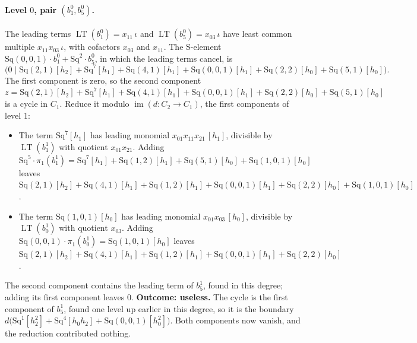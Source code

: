 \documentclass[11pt]{article}
\newcommand{\Sq}{\mathrm{Sq}}
\DeclareMathOperator{\LT}{LT}
\begin{document}
\paragraph{Level $0$, pair $(b^{0}_{1}, b^{0}_{5})$.} The leading terms $\LT(b^{0}_{1}) = x_{11}\,\iota$ and $\LT(b^{0}_{5}) = x_{03}\,\iota$ have least common multiple $x_{11}x_{03}\,\iota$, with cofactors $x_{03}$ and $x_{11}$. The S-element $\Sq(0,0,1)\cdot b^{0}_{1} + \Sq^{2}\cdot b^{0}_{5}$, in which the leading terms cancel, is
\[\bigl(0 \;\big|\; \Sq(2,1)[h_2] + \Sq^{7}[h_1] + \Sq(4,1)[h_1] + \Sq(0,0,1)[h_1] + \Sq(2,2)[h_0] + \Sq(5,1)[h_0]\bigr).\]
The first component is zero, so the second component $z = \Sq(2,1)[h_2] + \Sq^{7}[h_1] + \Sq(4,1)[h_1] + \Sq(0,0,1)[h_1] + \Sq(2,2)[h_0] + \Sq(5,1)[h_0]$ is a cycle in $C_{1}$.
Reduce it modulo $\operatorname{im}(d\colon C_{2}\to C_{1})$, the first components of level $1$:
\begin{itemize}
\item The term $\Sq^{7}[h_1]$ has leading monomial $x_{01}x_{11}x_{21}\,[h_1]$, divisible by $\LT(b^{1}_{1})$ with quotient $x_{01}x_{21}$. Adding $\Sq^{5}\cdot \pi_1(b^{1}_{1}) = \Sq^{7}[h_1] + \Sq(1,2)[h_1] + \Sq(5,1)[h_0] + \Sq(1,0,1)[h_0]$ leaves $\Sq(2,1)[h_2] + \Sq(4,1)[h_1] + \Sq(1,2)[h_1] + \Sq(0,0,1)[h_1] + \Sq(2,2)[h_0] + \Sq(1,0,1)[h_0]$.
\item The term $\Sq(1,0,1)[h_0]$ has leading monomial $x_{01}x_{03}\,[h_0]$, divisible by $\LT(b^{1}_{0})$ with quotient $x_{03}$. Adding $\Sq(0,0,1)\cdot \pi_1(b^{1}_{0}) = \Sq(1,0,1)[h_0]$ leaves $\Sq(2,1)[h_2] + \Sq(4,1)[h_1] + \Sq(1,2)[h_1] + \Sq(0,0,1)[h_1] + \Sq(2,2)[h_0]$.
\end{itemize}
The second component contains the leading term of $b^{1}_{5}$, found in this degree; adding its first component leaves $0$.
\textbf{Outcome: useless.} The cycle is the first component of $b^{1}_{5}$, found one level up earlier in this degree, so it is the boundary $d\bigl(\Sq^{1}[h_2^2] + \Sq^{4}[h_0h_2] + \Sq(0,0,1)[h_0^2]\bigr)$. Both components now vanish, and the reduction contributed nothing.
\medskip
\end{document}
